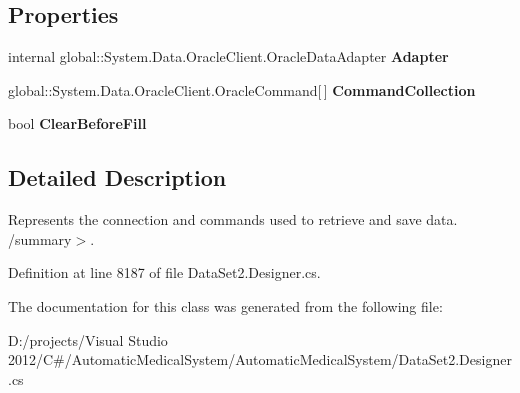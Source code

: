 \subsection*{Properties}
\begin{CompactItemize}
\item 
internal global::System.Data.OracleClient.OracleDataAdapter \textbf{Adapter}\hspace{0.3cm}{\tt  [get]}\label{class_automatic_medical_system_1_1_data_set2_table_adapters_1_1_p_a_t_i_e_n_t_s_table_adapter_b7eede1e349e82edbf580b01f32373ac}

\item 
global::System.Data.OracleClient.OracleCommand[$\,$] \textbf{CommandCollection}\hspace{0.3cm}{\tt  [get]}\label{class_automatic_medical_system_1_1_data_set2_table_adapters_1_1_p_a_t_i_e_n_t_s_table_adapter_f30d300d4cc5e3e16049256c20606ba0}

\item 
bool \textbf{ClearBeforeFill}\hspace{0.3cm}{\tt  [get, set]}\label{class_automatic_medical_system_1_1_data_set2_table_adapters_1_1_p_a_t_i_e_n_t_s_table_adapter_787ae858e95e04859a3f10140536f704}

\end{CompactItemize}


\subsection{Detailed Description}
Represents the connection and commands used to retrieve and save data. /summary$>$. 

Definition at line 8187 of file DataSet2.Designer.cs.

The documentation for this class was generated from the following file:\begin{CompactItemize}
\item 
D:/projects/Visual Studio 2012/C\#/AutomaticMedicalSystem/AutomaticMedicalSystem/DataSet2.Designer.cs\end{CompactItemize}
